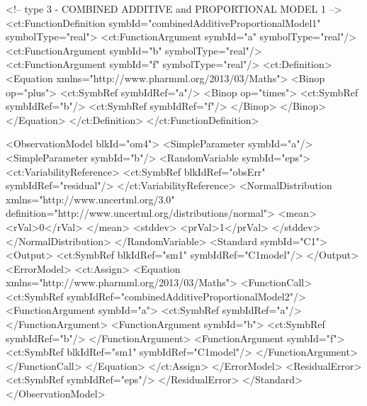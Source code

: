 \documentclass[a4paper,10pt]{article}
\begin{document}
\begin{xmlcode}
<!-- type 3 - COMBINED ADDITIVE and PROPORTIONAL MODEL 1 -->
<ct:FunctionDefinition symbId="combinedAdditiveProportionalModel1" symbolType="real">
    <ct:FunctionArgument symbId="a" symbolType="real"/>
    <ct:FunctionArgument symbId="b" symbolType="real"/>
    <ct:FunctionArgument symbId="f" symbolType="real"/>
    <ct:Definition>
        <Equation xmlns="http://www.pharmml.org/2013/03/Maths">
            <Binop op="plus">
                <ct:SymbRef symbIdRef="a"/>
                <Binop op="times">
                    <ct:SymbRef symbIdRef="b"/>
                    <ct:SymbRef symbIdRef="f"/>
                </Binop>                   
            </Binop>
        </Equation>
    </ct:Definition>
</ct:FunctionDefinition>

<ObservationModel blkId="om4">
    <SimpleParameter symbId="a"/>
    <SimpleParameter symbId="b"/>
    <RandomVariable symbId="eps">
        <ct:VariabilityReference>
            <ct:SymbRef blkIdRef="obsErr" symbIdRef="residual"/>
        </ct:VariabilityReference>
        <NormalDistribution xmlns="http://www.uncertml.org/3.0" definition="http://www.uncertml.org/distributions/normal">
            <mean>
                <rVal>0</rVal>
            </mean>
            <stddev>
                <prVal>1</prVal>
            </stddev>
        </NormalDistribution>
    </RandomVariable>
    <Standard symbId="C1">
        <Output>
            <ct:SymbRef blkIdRef="sm1" symbIdRef="C1model"/>
        </Output>
        <ErrorModel>
            <ct:Assign>
                <Equation xmlns="http://www.pharmml.org/2013/03/Maths">
                    <FunctionCall>
                        <ct:SymbRef symbIdRef="combinedAdditiveProportionalModel2"/>
                        <FunctionArgument symbId="a">
                            <ct:SymbRef symbIdRef="a"/>
                        </FunctionArgument>
                        <FunctionArgument symbId="b">
                            <ct:SymbRef symbIdRef="b"/>
                        </FunctionArgument>
                        <FunctionArgument symbId="f">
                            <ct:SymbRef blkIdRef="sm1" symbIdRef="C1model"/>
                        </FunctionArgument>
                    </FunctionCall>
                </Equation>
            </ct:Assign>
        </ErrorModel>
        <ResidualError>
            <ct:SymbRef symbIdRef="eps"/>
        </ResidualError>
    </Standard>
</ObservationModel>
\end{xmlcode}
\end{document}
